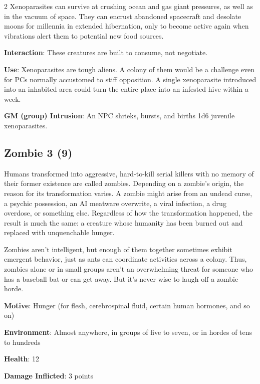 \begin{multicols}{2}
Xenoparasites can survive at crushing ocean and gas giant pressures, as well as in the vacuum of space. They can encrust abandoned spacecraft and desolate moons for millennia in extended hibernation, only to become active again when vibrations alert them to potential new food sources.

\textbf{Interaction}: These creatures are built to consume, not negotiate.

\textbf{Use}: Xenoparasites are tough aliens. A colony of them would be a challenge even for PCs normally accustomed to stiff opposition. A single xenoparasite introduced into an inhabited area could turn the entire place into an infested hive within a week.

\textbf{GM (group) Intrusion}: An NPC shrieks, bursts, and births 1d6 juvenile xenoparasites.

\subsection{Zombie	3 (9)}

Humans transformed into aggressive, hard-to-kill serial killers with no memory of their former existence are called zombies. Depending on a zombie’s origin, the reason for its transformation varies. A zombie might arise from an undead curse, a psychic possession, an AI meatware overwrite, a viral infection, a drug overdose, or something else. Regardless of how the transformation happened, the result is much the same: a creature whose humanity has been burned out and replaced with unquenchable hunger.

Zombies aren’t intelligent, but enough of them together sometimes exhibit emergent behavior, just as ants can coordinate activities across a colony. Thus, zombies alone or in small groups aren’t an overwhelming threat for someone who has a baseball bat or can get away. But it’s never wise to laugh off a zombie horde. 

\textbf{Motive}: Hunger (for flesh, cerebrospinal fluid, certain human hormones, and so on)

\textbf{Environment}: Almost anywhere, in groups of five to seven, or in hordes of tens to hundreds

\textbf{Health}: 12

\textbf{Damage Inflicted}: 3 points


\end{multicols}
